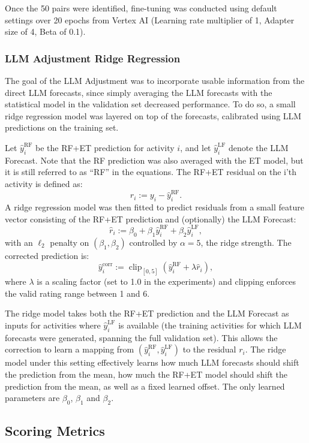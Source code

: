 Once the 50 pairs were identified, fine-tuning was conducted using default settings over 20 epochs from Vertex AI (Learning rate multiplier of 1, Adapter size of 4, Beta of 0.1).


\subsubsection{LLM Adjustment Ridge Regression}
\label{subsubsub:LLM_adjustment}

The goal of the LLM Adjustment was to incorporate usable information from the direct LLM forecasts, since simply averaging the LLM forecasts with the statistical model in the validation set decreased performance. To do so, a small ridge regression model was layered on top of the forecasts, calibrated using LLM predictions on the training set.

Let $\hat{y}^{\text{RF}}_i$ be the RF+ET prediction for activity $i$, and let $\hat{y}^{\text{LF}}_i$ denote the LLM Forecast. Note that the RF prediction was also averaged with the ET model, but it is still referred to as ``RF'' in the equations. The RF+ET residual on the i'th activity is defined as:
\[
r_i := y_i - \hat{y}^{\text{RF}}_i .
\]
A ridge regression model was then fitted to predict residuals from a small feature vector consisting of the RF+ET prediction and (optionally) the LLM Forecast:
\[
\hat{r}_i := \beta_0 + \beta_1 \hat{y}^{\text{RF}}_i + \beta_2 \hat{y}^{\text{LF}}_i ,
\]
with an $\ell_2$ penalty on $(\beta_1,\beta_2)$ controlled by $\alpha = 5$, the ridge strength. The corrected prediction is:
\[
\hat{y}^{\text{corr}}_i := \operatorname{clip}_{[0,5]}\!\left(\hat{y}^{\text{RF}}_i + \lambda \hat{r}_i\right),
\]
where $\lambda$ is a scaling factor (set to 1.0 in the experiments) and clipping enforces the valid rating range between 1 and 6.

The ridge model takes both the RF+ET prediction and the LLM Forecast as inputs for activities where $\hat{y}^{\text{LF}}_i$ is available (the training activities for which LLM forecasts were generated, spanning the full validation set). This allows the correction to learn a mapping from $(\hat{y}^{\text{RF}}_i, \hat{y}^{\text{LF}}_i)$ to the residual $r_i$. The ridge model under this setting effectively learns how much LLM forecasts should shift the prediction from the mean, how much the RF+ET model should shift the prediction from the mean, as well as a fixed learned offset. The only learned parameters are $\beta_0$, $\beta_1$ and $\beta_2$.

\subsection{Scoring Metrics} \label{sub:scoringmetrics}

